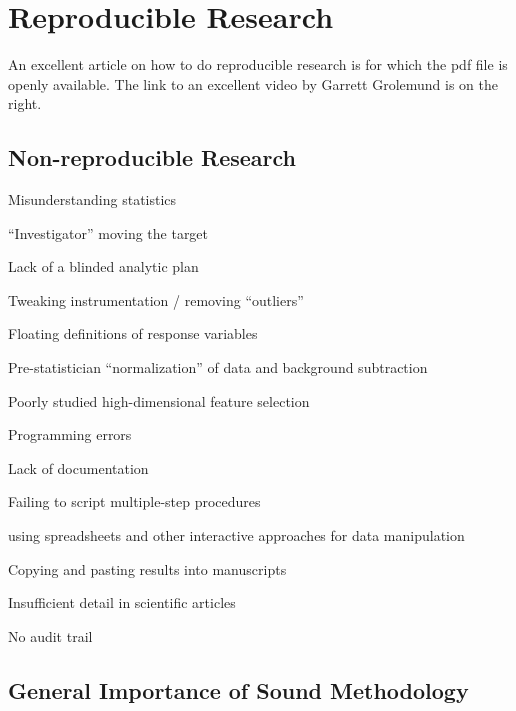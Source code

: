 \chapter{Reproducible Research}

An excellent article on how to do reproducible research is
\cite{mun17man} for which the pdf file is openly available.  The link
to an excellent video by Garrett Grolemund is on the right. 

\section{Non-reproducible Research}
\bi
\item Misunderstanding statistics
\item ``Investigator'' moving the target
\item Lack of a blinded analytic plan
\item Tweaking instrumentation / removing ``outliers''
\item Floating definitions of response variables
\item Pre-statistician ``normalization'' of data and background subtraction 
\item Poorly studied high-dimensional feature selection
\item Programming errors
\item Lack of documentation
\item Failing to script multiple-step procedures
 \bi
 \item using spreadsheets and other interactive approaches for data
 manipulation
 \ei
\item Copying and pasting results into manuscripts
\item Insufficient detail in scientific articles
\item No audit trail
\ei

\section{General Importance of Sound Methodology}
